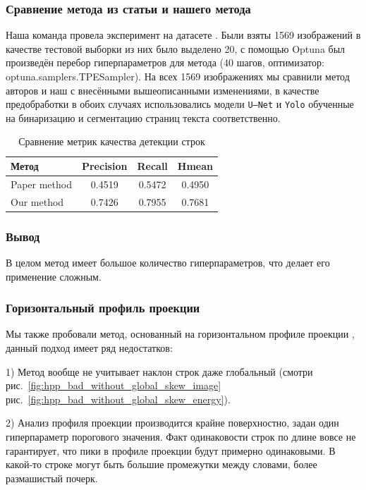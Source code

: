 \documentclass{article}
\begin{document}
\subsubsection{Сравнение метода из статьи и нашего метода}
Наша команда провела эксперимент на датасете \cite{potyashin2023hwr200}. Были взяты 1569 изображений в качестве тестовой выборки из них было выделено 20, с помощью Optuna был произведён перебор гиперпараметров для метода (40 шагов, оптимизатор: optuna.samplers.TPESampler). На всех 1569 изображениях мы сравнили метод авторов и наш с внесёнными вышеописанными изменениями, в качестве предобработки в обоих случаях использовались модели \texttt{U—Net} и \texttt{Yolo} обученные на бинаризацию и сегментацию страниц текста соответственно.

\begin{table}[h!]
\centering
\caption{Сравнение метрик качества детекции строк}
\begin{tabular}{lccc}
\hline
Метод & Precision & Recall & Hmean \\
\hline
Paper method & 0.4519 & 0.5472 & 0.4950 \\
Our method   & 0.7426 & 0.7955 & 0.7681 \\
\hline
\end{tabular}
\end{table}

\subsubsection{Вывод}

В целом метод имеет большое количество гиперпараметров, что делает его применение сложным.

\subsubsection{Горизонтальный профиль проекции}

Мы также пробовали метод, основанный на горизонтальном профиле проекции \cite{das-2023-seam-carving}, данный подход имеет ряд недостатков:

1) Метод вообще не учитывает наклон строк даже глобальный (смотри рис.~\ref{fig:hpp_bad_without_global_skew_image} рис.~\ref{fig:hpp_bad_without_global_skew_energy}).

2) Анализ профиля проекции производится крайне поверхностно, задан один гиперпараметр порогового значения. Факт одинаковости строк по длине вовсе не гарантирует, что пики в профиле проекции будут примерно одинаковыми. В какой-то строке могут быть большие промежутки между словами, более размашистый почерк.
\end{document}
